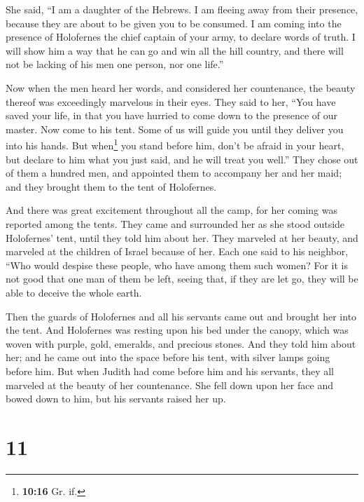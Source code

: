 She said, ``I am a daughter of the Hebrews. I am fleeing away from their
presence, because they are about to be given you to be consumed.
 I am coming into the presence of Holofernes the chief
captain of your army, to declare words of truth. I will show him a way
that he can go and win all the hill country, and there will not be
lacking of his men one person, nor one life.''

 Now when the men heard her words, and considered her
countenance, the beauty thereof was exceedingly marvelous in their eyes.
They said to her,  ``You have saved your life, in that
you have hurried to come down to the presence of our master. Now come to
his tent. Some of us will guide you until they deliver you into his
hands.  But when\footnote{\textbf{10:16} Gr. if.} you
stand before him, don't be afraid in your heart, but declare to him what
you just said, and he will treat you well.''  They chose
out of them a hundred men, and appointed them to accompany her and her
maid; and they brought them to the tent of Holofernes.

 And there was great excitement throughout all the camp,
for her coming was reported among the tents. They came and surrounded
her as she stood outside Holofernes' tent, until they told him about
her.  They marveled at her beauty, and marveled at the
children of Israel because of her. Each one said to his neighbor, ``Who
would despise these people, who have among them such women? For it is
not good that one man of them be left, seeing that, if they are let go,
they will be able to deceive the whole earth.

 Then the guards of Holofernes and all his servants came
out and brought her into the tent.  And Holofernes was
resting upon his bed under the canopy, which was woven with purple,
gold, emeralds, and precious stones.  And they told him
about her; and he came out into the space before his tent, with silver
lamps going before him.  But when Judith had come before
him and his servants, they all marveled at the beauty of her
countenance. She fell down upon her face and bowed down to him, but his
servants raised her up.

\hypertarget{section-10}{%
\section{11}\label{section-10}}

